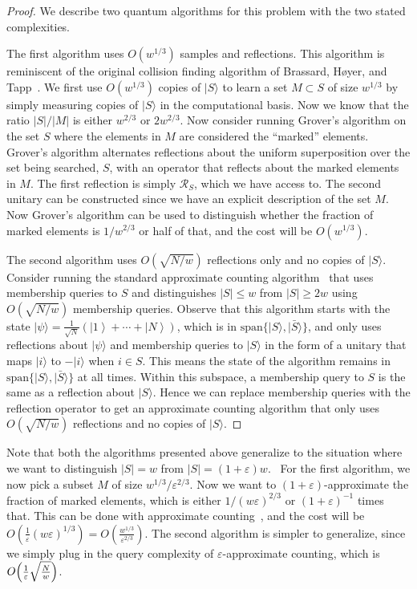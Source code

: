 \documentclass[10pt,a4paper]{article}
\newcommand{\<}{\langle}
\renewcommand{\>}{\rangle}
\newcommand{\R}{\mathcal R}
\begin{document}
\begin{proof}
We describe two quantum algorithms for this problem with the two stated complexities.

The first algorithm uses $O(w^{1/3})$ samples and reflections. This algorithm is reminiscent of the original collision finding algorithm of Brassard, H{\o}yer, and Tapp~\cite{BHT98}. We first use $O(w^{1/3})$ copies of $|S\>$ to learn a set $M\subset S$ of size $w^{1/3}$ by simply measuring copies of $|S\>$ in the computational basis. Now we know that the ratio $|S|/|M|$ is either $w^{2/3}$ or $2w^{2/3}$. Now consider running Grover's algorithm on the set $S$ where the elements in $M$ are considered the ``marked'' elements. Grover's algorithm alternates reflections about the uniform superposition over the set being searched, $S$, with an operator that reflects about the marked elements in $M$. The first reflection is simply $\R_S$, which we have access to. The second unitary can be constructed since we have an explicit description of the set $M$. Now Grover's algorithm can be used to distinguish whether the fraction of marked elements is $1/w^{2/3}$ or half of that, and the cost will be $O(w^{1/3})$.

The second algorithm uses $O(\sqrt{{N}/{w}})$ reflections only and no copies of $|S\>$. 
Consider running the standard approximate counting algorithm~\cite{BHMT02} that uses membership queries to $S$ and distinguishes $|S|\leq w$ from $|S|\geq 2w$ using $O(\sqrt{N/w})$ membership queries. 
Observe that this algorithm starts with the state $|\psi\> =\frac{1}{
\sqrt{N}}\left( \left\vert 1\right\rangle +\cdots +\left\vert N\right\rangle
\right)$, which is in $\textrm{span}\{|S\>,|\bar{S}\>\}$, and only uses reflections about $|\psi\> $ and membership queries to $|S\>$ in the form of a unitary that maps $|i\>$ to $-|i\>$ when $i \in S$.
This means the state of the algorithm remains in $\textrm{span}\{|S\>,|\bar{S}\>\}$
at all times. 
Within this subspace, a membership query to $S$ is the same as a reflection about $|S\>$.
Hence we can replace membership queries with the reflection operator to get an approximate counting algorithm that only uses $O(\sqrt{N/w})$ reflections and no copies of $|S\>$.
\end{proof}

Note that both the algorithms presented above generalize to the situation
where we want to distinguish $|S|=w$ from $|S|=(1+\varepsilon )w$. \ For the
first algorithm, we now pick a subset $M$ of size $w^{1/3}/\varepsilon ^{2/3}
$. Now we want to $(1+\varepsilon )$-approximate the fraction of marked
elements, which is either $1/(w\varepsilon )^{2/3}$ or $(1+\varepsilon )^{-1}
$ times that. This can be done with approximate counting~\cite[Theorem 15]
{BHMT02}, and the cost will be $O\left( \frac{1}{\varepsilon }(w\varepsilon
)^{1/3}\right) =O\left( \frac{w^{1/3}}{\varepsilon ^{2/3}}\right) $.
The second algorithm is simpler to generalize, since we simply plug in
the query complexity of $\varepsilon$-approximate counting, which is 
$O\Bigl( \frac{1}{\varepsilon }\sqrt{\frac{N}{w}}\Bigr) $.
\end{document}
